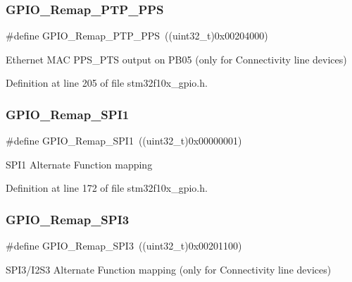 \subsubsection{\texorpdfstring{G\+P\+I\+O\+\_\+\+Remap\+\_\+\+P\+T\+P\+\_\+\+P\+PS}{GPIO\_Remap\_PTP\_PPS}}
{\footnotesize\ttfamily \#define G\+P\+I\+O\+\_\+\+Remap\+\_\+\+P\+T\+P\+\_\+\+P\+PS~((uint32\+\_\+t)0x00204000)}

Ethernet M\+AC P\+P\+S\+\_\+\+P\+TS output on P\+B05 (only for Connectivity line devices) 

Definition at line 205 of file stm32f10x\+\_\+gpio.\+h.

\mbox{\label{group___g_p_i_o___remap__define_ga58b02a04a6041954c6e99e681716ab4c}} 
\subsubsection{\texorpdfstring{G\+P\+I\+O\+\_\+\+Remap\+\_\+\+S\+P\+I1}{GPIO\_Remap\_SPI1}}
{\footnotesize\ttfamily \#define G\+P\+I\+O\+\_\+\+Remap\+\_\+\+S\+P\+I1~((uint32\+\_\+t)0x00000001)}

S\+P\+I1 Alternate Function mapping 

Definition at line 172 of file stm32f10x\+\_\+gpio.\+h.

\mbox{\label{group___g_p_i_o___remap__define_gac7fd74244a9d53ca02cc86bb6543a689}} 
\subsubsection{\texorpdfstring{G\+P\+I\+O\+\_\+\+Remap\+\_\+\+S\+P\+I3}{GPIO\_Remap\_SPI3}}
{\footnotesize\ttfamily \#define G\+P\+I\+O\+\_\+\+Remap\+\_\+\+S\+P\+I3~((uint32\+\_\+t)0x00201100)}

S\+P\+I3/\+I2\+S3 Alternate Function mapping (only for Connectivity line devices) 

